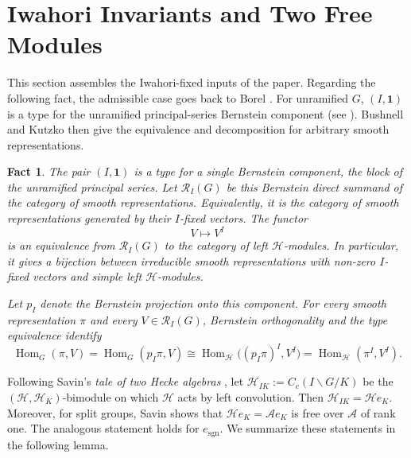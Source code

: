 \documentclass[12pt]{article}
\numberwithin{equation}{section}
\newtheorem{fact}[theorem]{Fact}
\theoremstyle{definition}
\theoremstyle{remark}
\theoremstyle{plain}
\begin{document}
\section{Iwahori Invariants and Two Free Modules}\label{sec:iwahori_fixed}

This section assembles the Iwahori-fixed inputs of the paper. Regarding the following fact, the admissible case goes back to Borel \cite[Theorem 4.10 and Corollaries 4.11--4.12]{Bo}. For unramified $G$, $(I,\mathbf 1)$ is a type for the unramified principal-series Bernstein component (see \cite[Proposition 3.3.1]{Haines12}). Bushnell and Kutzko \cite[Theorem 4.3(ii)--(iii)]{BK} then give the equivalence and decomposition for arbitrary smooth representations.

\begin{fact}\label{fact:borel}
The pair $(I,\mathbf 1)$ is a type for a single Bernstein component, the block of the unramified principal series. Let $\mathcal R_I(G)$ be this Bernstein direct summand of the category of smooth representations. Equivalently, it is the category of smooth representations generated by their $I$-fixed vectors. The functor
$$V\longmapsto V^I$$
is an equivalence from $\mathcal R_I(G)$ to the category of left $\mathcal H$-modules. In particular, it gives a bijection between irreducible smooth representations with non-zero $I$-fixed vectors and simple left $\mathcal H$-modules.

Let $p_I$ denote the Bernstein projection onto this component. For every smooth representation $\pi$ and every $V\in\mathcal R_I(G)$, Bernstein orthogonality and the type equivalence identify
$$\operatorname{Hom}_G(\pi,V)=\operatorname{Hom}_G(p_I\pi,V)\cong\operatorname{Hom}_{\mathcal H}\bigl((p_I\pi)^I,V^I\bigr)=\operatorname{Hom}_{\mathcal H}(\pi^I,V^I).$$
\end{fact}

Following Savin's \emph{tale of two Hecke algebras} \cite{Sav}, let $\mathcal{H}_{IK} := C_c(I\backslash G/K)$ be the $(\mathcal{H}, \mathcal{H}_K)$-bimodule on which $\mathcal{H}$ acts by left convolution. Then $\mathcal{H}_{IK} = \mathcal{H}e_K$. Moreover, for split groups, Savin shows that $\mathcal{H}e_K = \mathcal{A}e_K$ is free over $\mathcal{A}$ of rank one. The analogous statement holds for $e_{\mathrm{sgn}}$. We summarize these statements in the following lemma.
\end{document}

